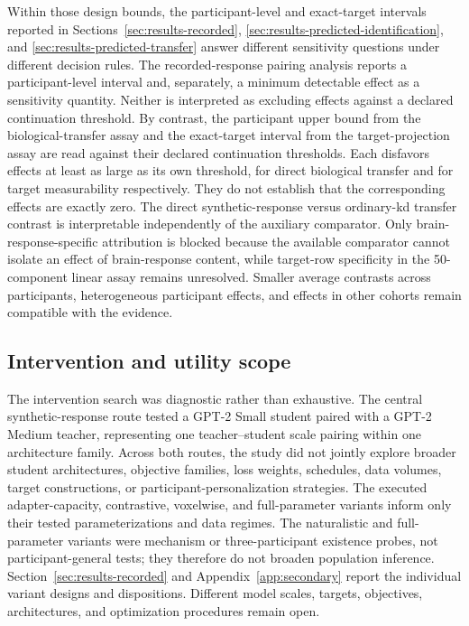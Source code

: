  Within those design bounds, the participant-level and exact-target intervals reported in Sections~\ref{sec:results-recorded}, \ref{sec:results-predicted-identification}, and \ref{sec:results-predicted-transfer} answer different sensitivity questions under different decision rules.
The recorded-response pairing analysis reports a participant-level interval and, separately, a minimum detectable effect as a sensitivity quantity.
Neither is interpreted as excluding effects against a declared continuation threshold.
By contrast, the participant upper bound from the biological-transfer assay and the exact-target interval from the target-projection assay are read against their declared continuation thresholds.
Each disfavors effects at least as large as its own threshold, for direct biological transfer and for target measurability respectively.
They do not establish that the corresponding effects are exactly zero.
The direct synthetic-response versus ordinary-\ac{kd} transfer contrast is interpretable independently of the auxiliary comparator.
Only brain-response-specific attribution is blocked because the available comparator cannot isolate an effect of brain-response content, while target-row specificity in the 50-component linear assay remains unresolved.
Smaller average contrasts across participants, heterogeneous participant effects, and effects in other cohorts remain compatible with the evidence.

\subsection{Intervention and utility scope}

The intervention search was diagnostic rather than exhaustive.
The central synthetic-response route tested a GPT-2 Small student paired with a GPT-2 Medium teacher, representing one teacher--student scale pairing within one architecture family.
Across both routes, the study did not jointly explore broader student architectures, objective families, loss weights, schedules, data volumes, target constructions, or participant-personalization strategies.
The executed adapter-capacity, contrastive, voxelwise, and full-parameter variants inform only their tested parameterizations and data regimes.
The naturalistic and full-parameter variants were mechanism or three-participant existence probes, not participant-general tests; they therefore do not broaden population inference.
Section~\ref{sec:results-recorded} and Appendix~\ref{app:secondary} report the individual variant designs and dispositions.
Different model scales, targets, objectives, architectures, and optimization procedures remain open.

